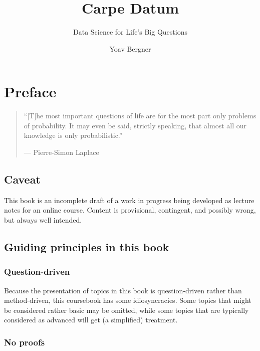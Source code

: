 \documentclass[openany]{book}
\title{Carpe Datum}
\subtitle{Data Science for Life's Big Questions}
\author{Yoav Bergner}
\date{}
\begin{document}
\maketitle

\hypertarget{preface}{%
\chapter*{Preface}\label{preface}}

\begin{quote}
``{[}T{]}he most important questions of life are for the most part only problems of probability. It may even be said, strictly speaking, that almost all our knowledge is only probabilistic.''

--- Pierre-Simon Laplace
\end{quote}

\hypertarget{caveat}{%
\section*{Caveat}\label{caveat}}

This book is an incomplete draft of a work in progress being developed as lecture notes for an online course. Content is provisional, contingent, and possibly wrong, but always well intended.

\hypertarget{guiding-principles-in-this-book}{%
\section*{Guiding principles in this book}\label{guiding-principles-in-this-book}}

\hypertarget{question-driven}{%
\subsection*{Question-driven}\label{question-driven}}

Because the presentation of topics in this book is question-driven rather than method-driven, this coursebook has some idiosyncracies. Some topics that might be considered rather basic may be omitted, while some topics that are typically considered as advanced will get (a simplified) treatment.

\hypertarget{no-proofs}{%
\subsection*{No proofs}\label{no-proofs}}
\end{document}
